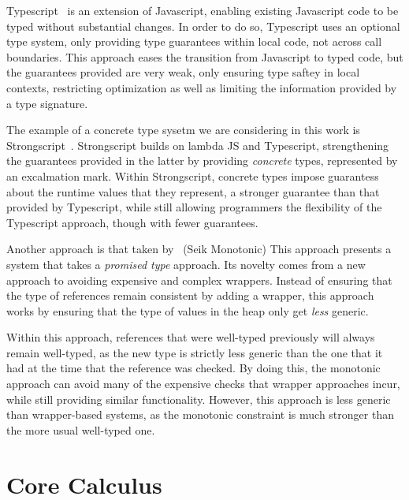 \documentclass{sigplanconf}
\begin{document}
Typescript~\cite{typescript13} is an extension of Javascript, enabling existing 
Javascript code to be typed without substantial changes. In order to do so, 
Typescript uses an optional type system, only providing type guarantees within 
local code, not across call boundaries. This approach eases the transition from
Javascript to typed code, but the guarantees provided are very weak, only 
ensuring type saftey in local contexts, restricting optimization as well as
limiting the information provided by a type signature.

The example of a concrete type sysetm we are considering in this work is
Strongscript~\cite{stongscript}. Strongscript builds on lambda JS and 
Typescript, strengthening the guarantees provided in the latter by providing
\emph{concrete} types, represented by an excalmation mark. Within Strongscript,
concrete types impose guarantess about the runtime values that they represent, 
a stronger guarantee than that provided by Typescript, while still allowing
programmers the flexibility of the Typescript approach, though with fewer
guarantees.

Another approach is that taken by~\cite{seik-monotonic} (Seik Monotonic)
This approach presents a system that takes a \emph{promised type} approach.
Its novelty comes from a new approach to avoiding expensive and complex
wrappers. Instead of ensuring that the type of references remain consistent
by adding a wrapper, this approach works by ensuring that the type of values in
the heap only get \emph{less} generic.

Within this approach, references that were well-typed previously will always
remain well-typed, as the new type is strictly less generic than the one that
it had at the time that the reference was checked. By doing this, the monotonic
approach can avoid many of the expensive checks that wrapper approaches incur, 
while still providing similar functionality. However, this approach is less
generic than wrapper-based systems, as the monotonic constraint is much stronger
than the more usual well-typed one.

\section{Core Calculus}
\end{document}

